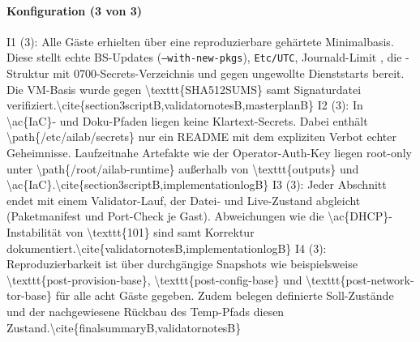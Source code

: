 \paragraph{Konfiguration (3 von 3)}
I1 (3): Alle Gäste erhielten über  eine reproduzierbare gehärtete Minimalbasis. Diese stellt echte \ac{BS}-Updates (\texttt{--with-new-pkgs}), \texttt{Etc/UTC}, Journald-Limit , die -Struktur mit 0700-Secrets-Verzeichnis und  gegen ungewollte Dienststarts bereit. 
Die \ac{VM-Basis wurde gegen \texttt{SHA512SUMS} samt Signaturdatei verifiziert.\cite{section3scriptB,validatornotesB,masterplanB}
I2 (3): In \ac{IaC}- und Doku-Pfaden liegen keine Klartext-Secrets. Dabei enthält \path{/etc/ailab/secrets} nur ein README mit dem expliziten Verbot echter Geheimnisse. 
Laufzeitnahe Artefakte wie der Operator-Auth-Key liegen root-only unter \path{/root/ailab-runtime} außerhalb von \texttt{outputs} und \ac{IaC}.\cite{section3scriptB,implementationlogB}
I3 (3): Jeder Abschnitt endet mit einem Validator-Lauf, der Datei- und Live-Zustand abgleicht (Paketmanifest und Port-Check je Gast). Abweichungen wie die \ac{DHCP}-Instabilität von \texttt{101} sind samt Korrektur dokumentiert.\cite{validatornotesB,implementationlogB}
I4 (3): Reproduzierbarkeit ist über durchgängige Snapshots wie beispielsweise \texttt{post-provision-base}, \texttt{post-config-base} und \texttt{post-network-tor-base} für alle acht Gäste gegeben. Zudem belegen definierte Soll-Zustände und der nachgewiesene Rückbau des Temp-Pfads
diesen Zustand.\cite{finalsummaryB,validatornotesB}

}
